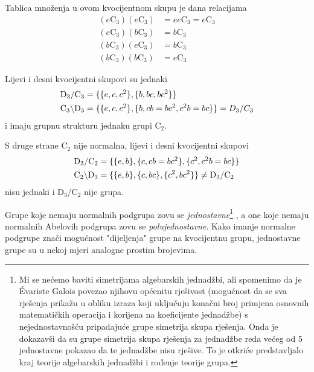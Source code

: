 \begin{primjer}
Tablica množenja u ovom kvocijentnom skupu je dana relacijama
\begin{align}
    (e\mathrm{C}_3)(e\mathrm{C}_3) &= ee \mathrm{C}_3 = e\mathrm{C}_3\\
    (e\mathrm{C}_3)(b\mathrm{C}_3) &= b\mathrm{C}_3  \\
    (b\mathrm{C}_3)(e\mathrm{C}_3) &= b\mathrm{C}_3  \\
    (b\mathrm{C}_3)(b\mathrm{C}_3) &= e\mathrm{C}_3 
\end{align}

Lijevi i desni kvocijentni skupovi su jednaki
\begin{align*}
{\rm D}_{3}/{\rm C}_3 &= \{\{e,c,c^2\}, \{b, bc, bc^2\}\} \\
{\rm C}_3\backslash{\rm D}_{3} &= \{\{e,c,c^2\}, \{b, cb=bc^2, c^2b=bc\}\}
    = D_{3}/C_3
\end{align*}
i imaju grupnu strukturu jednaku grupi $\mathrm{C}_2$.
\label{pr:D3oC3}
\end{primjer}

S druge strane $\mathrm{C}_2$ nije normalna, lijevi i desni kvocijentni
skupovi
\begin{align*}
{\rm D}_{3}/{\rm C}_2 &= \{\{e,b\}, \{c, cb=bc^2\}, \{c^2, c^2b=bc\}\} \\
{\rm C}_2\backslash{\rm D}_{3} &= \{\{e,b\}, \{c, bc\}, \{c^2, bc^2\}\}
    \neq {\rm D}_{3}/{\rm C}_2
\end{align*}
nisu jednaki i $\mathrm{D}_{3}$/$\mathrm{C}_2$ nije grupa.

Grupe koje nemaju normalnih podgrupa zovu se \emph{jednostavne}\footnote{Mi se
    nećemo baviti simetrijama algebarskih jednadžbi, ali spomenimo
    da je \'{E}variste Galois povezao njihovu općenitu rješivost (mogućnost
    da se sva rješenja prikažu u obliku izraza koji uključuju konačni broj
    primjena osnovnih matematičkih operacija i korijena na
    koeficijente jednadžbe) s nejednostavnošću pripadajuće grupe simetrija
    skupa rješenja. Onda je dokazavši da su grupe simetrija skupa rješenja za jednadžbe reda
    većeg od 5 jednostavne pokazao da te jednadžbe nisu rješive. To je otkriće predstavljalo
kraj teorije algebarskih jednadžbi i rođenje teorije grupa.\label{fus:galois}} ,
a one koje nemaju normalnih Abelovih podgrupa zovu se \emph{polujednostavne}.
Kako imanje normalne podgrupe znači mogućnost "dijeljenja" grupe na kvocijentnu
grupu, jednostavne grupe su u nekoj mjeri analogne prostim brojevima.


